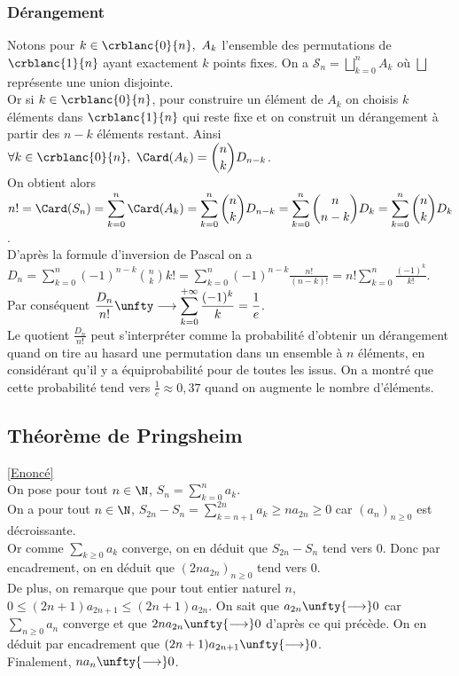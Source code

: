\documentclass{book}
\begin{document}
	\subsubsection{Dérangement }
	Notons pour $k\in \crblanc{0}{n},\ A_k$ l'ensemble des permutations de $\crblanc{1}{n}$ ayant exactement $k$ points fixes. On a $\mathcal S_n=\displaystyle\bigsqcup_{k=0}^nA_k$ où $\displaystyle\bigsqcup$ représente une union disjointe.\\
	Or si $k\in \crblanc{0}{n}$, pour construire un élément de $A_k$ on choisis $k$ éléments dans $\crblanc{1}{n}$ qui reste fixe et on construit un dérangement à partir des $n-k$ éléments restant. Ainsi $\forall k\in \crblanc{0}{n},\ \Card(A_k)=\displaystyle\binom{n}{k}D_{n-k}$.\\
	On obtient alors $n!=\Card(S_n)=\displaystyle\sum_{k=0}^n\Card(A_k)=\sum_{k=0}^n\binom{n}{k}D_{n-k}=\sum_{k=0}^n\binom{n}{n-k}D_k=\sum_{k=0}^n\binom{n}{k}D_k$.\\
	D'après la formule d'inversion de Pascal on a $D_n=\displaystyle\sum_{k=0}^n(-1)^{n-k}\binom{n}{k}k!=\sum_{k=0}^n(-1)^{n-k}\frac{n!}{(n-k)!}=n!\sum_{k=0}^n\frac{(-1)^k}{k!}$.\\
	Par conséquent $\displaystyle\frac{D_n}{n!}\unfty\longrightarrow\sum_{k=0}^{+\infty}\frac{(-1)^k}{k}=\frac{1}{e}$.\\
	Le quotient $\displaystyle\frac{D_n}{n!}$ peut s'interpréter comme la probabilité d'obtenir un dérangement quand on tire au hasard une permutation dans un ensemble à $n$ éléments, en considérant qu'il y a équiprobabilité pour de toutes les issus. On a montré que cette probabilité tend vers $\displaystyle\frac{1}{e}\approx0,37$ quand on augmente le nombre d'éléments.
	
	\subsection{Théorème de Pringsheim }
	\label{sec:theoreme-de-pringsheim-etoile3}
	\textcolor{blue}{\hyperref[Théorème de Pringsheim]{[Enoncé]}}\\
	On pose pour tout $n\in\N$, $S_n=\displaystyle\sum\limits_{k=0}^na_k$.
	\\On a pour tout $n\in\N$, $S_{2n}-S_n=\displaystyle\sum\limits_{k=n+1}^{2n}a_k\geq na_{2n}\geq0$ car $(a_n)_{n\geq 0}$ est décroissante.
	\\ Or comme $\displaystyle\sum\limits_{k\geq 0}a_k$ converge, on en déduit que $S_{2n}-S_n$ tend vers $0$. Donc par encadrement, on en déduit que $(2na_{2n})_{n\geq 0}$ tend vers $0$.
	\\De plus, on remarque que pour tout entier naturel $n$, $0\leq (2n+1)a_{2n+1}\leq (2n+1)a_{2n}$. On sait que $a_{2n}\unfty{\longrightarrow}0$ car $\displaystyle\sum\limits_{n\geq 0}a_n$ converge et que $2na_{2n}\unfty{\longrightarrow}0$ d'après ce qui précède. On en déduit par encadrement que $(2n+1)a_{2n+1}\unfty{\longrightarrow}0$.
	\\Finalement, $na_n\unfty{\longrightarrow}0$.
	
\end{document}
